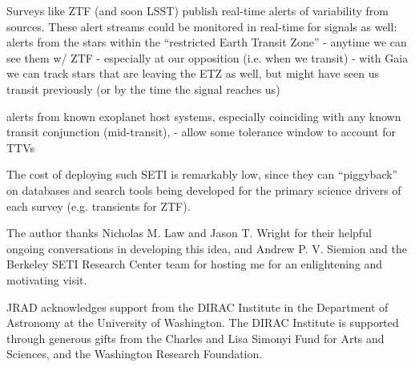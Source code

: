 \documentclass[twocolumn]{aastex62}
\begin{document}
Surveys like ZTF (and soon LSST) publish real-time alerts of variability from sources. These alert streams could be monitored in real-time for signals as well:
alerts from the stars within the ``restricted Earth Transit Zone'' \citep{heller2016}
	- anytime we can see them w/ ZTF
	- especially at our opposition (i.e. when we transit)
	- with Gaia we can track stars that are leaving the ETZ as well, but might 
	have seen us transit previously (or by the time the signal reaches us)

alerts from known exoplanet host systems, especially coinciding with any known transit conjunction (mid-transit), 
	- allow some tolerance window to account for TTVs



The cost of deploying such SETI is remarkably low, since they can ``piggyback'' on databases and search tools being developed for the primary science drivers of each survey (e.g. transients for ZTF).




\acknowledgments

The author thanks Nicholas M. Law and Jason T. Wright for their helpful ongoing conversations in developing this idea, and Andrew P. V. Siemion and the Berkeley SETI Research Center team for hosting me for an enlightening and motivating visit.

JRAD acknowledges support from the DIRAC Institute in the Department of Astronomy at the University of Washington. The DIRAC Institute is supported through generous gifts from the Charles and Lisa Simonyi Fund for Arts and Sciences, and the Washington Research Foundation.


\end{document}
